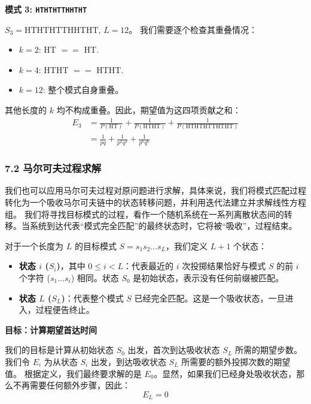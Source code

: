 \documentclass[UTF8]{ctexart}
\begin{document}
\textbf{模式 3: \texttt{HTHTHTTHHTHT}}

$S_3 = \text{HTHTHTTHHTHT}$, $L=12$。
我们需要逐个检查其重叠情况：
\begin{itemize}
    \item $k=2$: HT $==$ HT.
    \item $k=4$: HTHT $==$ HTHT.
    \item $k=12$: 整个模式自身重叠。
\end{itemize}
其他长度的 $k$ 均不构成重叠。因此，期望值为这四项贡献之和：
\begin{align*}
    E_3 &= \frac{1}{P(\text{HT})} + \frac{1}{P(\text{HTHT})}  + \frac{1}{P(\text{HTHTHTTHTHT})} \\
        &= \frac{1}{pq} + \frac{1}{p^2q^2}  + \frac{1}{p^6q^6}
\end{align*}



\subsubsection*{7.2 马尔可夫过程求解}
我们也可以应用马尔可夫过程对原问题进行求解，具体来说，我们将模式匹配过程转化为一个吸收马尔可夫链中的状态转移问题，并利用迭代法建立并求解线性方程组。
我们将寻找目标模式的过程，看作一个随机系统在一系列离散状态间的转移。当系统到达代表“模式完全匹配”的最终状态时，它将被“吸收”，过程结束。


对于一个长度为 $L$ 的目标模式 $S = s_1s_2...s_L$，我们定义 $L+1$ 个状态：
\begin{itemize}
    \item \textbf{状态 $i$ ($S_i$)}，其中 $0 \le i < L$：代表最近的 $i$ 次投掷结果恰好与模式 $S$ 的前 $i$ 个字符 ($s_1...s_i$) 相同。状态 $S_0$ 是初始状态，表示没有任何前缀被匹配。
    \item \textbf{状态 $L$ ($S_L$)}：代表整个模式 $S$ 已经完全匹配。这是一个吸收状态，一旦进入，过程便告终止。
\end{itemize}

\textbf{目标：计算期望首达时间}

我们的目标是计算从初始状态 $S_0$ 出发，首次到达吸收状态 $S_L$ 所需的期望步数。我们令 $E_i$ 为从状态 $S_i$ 出发，到达吸收状态 $S_L$ 所需要的额外投掷次数的期望值。
根据定义，我们最终要求解的是 $E_0$。显然，如果我们已经身处吸收状态，那么不再需要任何额外步骤，因此：
$$ E_L = 0 $$
\end{document}
